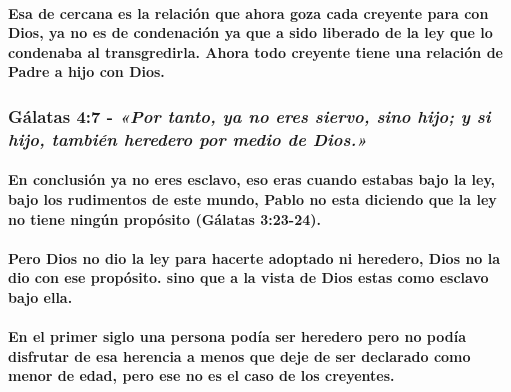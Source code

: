 \documentclass[11a pt,twoside]{article}
\newcommand{\scripture}[1]{%
  {\fontsize{12pt}{16pt}\selectfont\ScriptureFont\itshape #1}%
}
\let\oldsubsubsection\subsubsection
\renewcommand{\subsubsection}{\needspace{4\baselineskip}\oldsubsubsection}
\let\oldparagraph\paragraph
\renewcommand{\paragraph}{\needspace{3\baselineskip}\oldparagraph}
\begin{document}
\paragraph{Esa de cercana es la relación que ahora goza cada creyente
para con Dios, ya no es de condenación ya que a sido liberado de la ley
que lo condenaba al transgredirla. Ahora todo creyente tiene una
relación de Padre a hijo con
Dios.}\label{esa-de-cercana-es-la-relaciuxf3n-que-ahora-goza-cada-creyente-para-con-dios-ya-no-es-de-condenaciuxf3n-ya-que-a-sido-liberado-de-la-ley-que-lo-condenaba-al-transgredirla.-ahora-todo-creyente-tiene-una-relaciuxf3n-de-padre-a-hijo-con-dios.}

\subsubsection{\texorpdfstring{Gálatas 4:7 -
\scripture{«Por tanto, ya no eres siervo, sino hijo; y si hijo, también heredero por medio de Dios.»}}{Gálatas 4:7 - }}\label{guxe1latas-47---por-tanto-ya-no-eres-siervo-sino-hijo-y-si-hijo-tambiuxe9n-heredero-por-medio-de-dios.}

\paragraph{En conclusión ya no eres esclavo, eso eras cuando estabas
bajo la ley, bajo los rudimentos de este mundo, Pablo no esta diciendo
que la ley no tiene ningún propósito (Gálatas
3:23-24).}\label{en-conclusiuxf3n-ya-no-eres-esclavo-eso-eras-cuando-estabas-bajo-la-ley-bajo-los-rudimentos-de-este-mundo-pablo-no-esta-diciendo-que-la-ley-no-tiene-ninguxfan-propuxf3sito-guxe1latas-323-24.}

\paragraph{Pero Dios no dio la ley para hacerte adoptado ni heredero,
Dios no la dio con ese propósito. sino que a la vista de Dios estas como
esclavo bajo
ella.}\label{pero-dios-no-dio-la-ley-para-hacerte-adoptado-ni-heredero-dios-no-la-dio-con-ese-propuxf3sito.-sino-que-a-la-vista-de-dios-estas-como-esclavo-bajo-ella.}

\paragraph{En el primer siglo una persona podía ser heredero pero no
podía disfrutar de esa herencia a menos que deje de ser declarado como
menor de edad, pero ese no es el caso de los
creyentes.}\label{en-el-primer-siglo-una-persona-poduxeda-ser-heredero-pero-no-poduxeda-disfrutar-de-esa-herencia-a-menos-que-deje-de-ser-declarado-como-menor-de-edad-pero-ese-no-es-el-caso-de-los-creyentes.}
\end{document}
